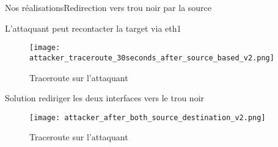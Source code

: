 \begin{frame}{Nos réalisations}{Redirection vers trou noir par la source}

    {\large {\color{cyan}L'attaquant peut recontacter la target via eth1}}
    \begin{figure}[H]
        \texttt{[image: attacker\_traceroute\_30seconds\_after\_source\_based\_v2.png]}
        \caption*{Traceroute sur l'attaquant}
    \end{figure}

    {\large {\color{red}Solution rediriger les deux interfaces vers le trou noir}}
    \begin{figure}[H]
        \texttt{[image: attacker\_after\_both\_source\_destination\_v2.png]}
        \caption*{Traceroute sur l'attaquant}
    \end{figure}

\end{frame}